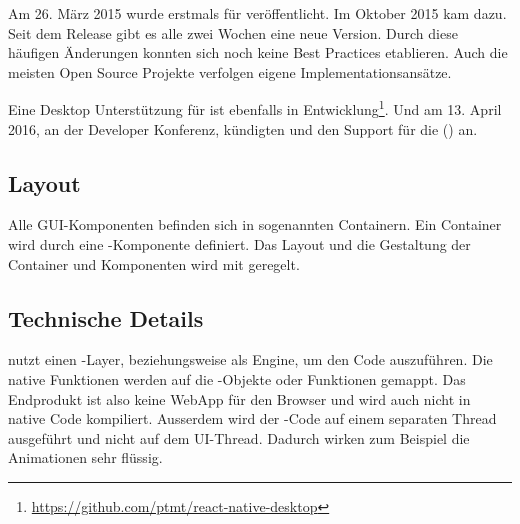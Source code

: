 Am 26. März 2015 wurde  erstmals für  veröffentlicht.
Im Oktober 2015 kam  dazu.\cite{react-native-release}
Seit dem Release gibt es alle zwei Wochen eine neue Version. 
Durch diese häufigen Änderungen konnten sich noch keine Best Practices etablieren. 
Auch die meisten Open Source Projekte verfolgen eigene Implementationsansätze.

Eine Desktop Unterstützung für  ist ebenfalls in Entwicklung\footnote{\url{https://github.com/ptmt/react-native-desktop}}. 
Und am 13. April 2016, an der  Developer Konferenz, kündigten  und  den Support für die  () an.\cite{react-native-windows}


\subsection{Layout}
Alle \gls{GUI}-Komponenten befinden sich in sogenannten Containern. 
Ein Container wird durch eine -Komponente definiert. 
Das Layout und die Gestaltung der Container und Komponenten wird mit  geregelt. 

\subsection{Technische Details}
 nutzt einen -Layer, beziehungsweise  als Engine, um den Code auszuführen.\cite{react-native-javascriptcore} 
Die native Funktionen werden auf die -Objekte oder Funktionen gemappt. 
Das Endprodukt ist also keine \gls{WebApp} für den Browser und wird auch nicht in native Code kompiliert. 
Ausserdem wird der -Code auf einem separaten Thread ausgeführt und nicht auf dem UI-Thread. 
Dadurch wirken zum Beispiel die Animationen sehr flüssig.\cite{react-native-javascript-thread}


